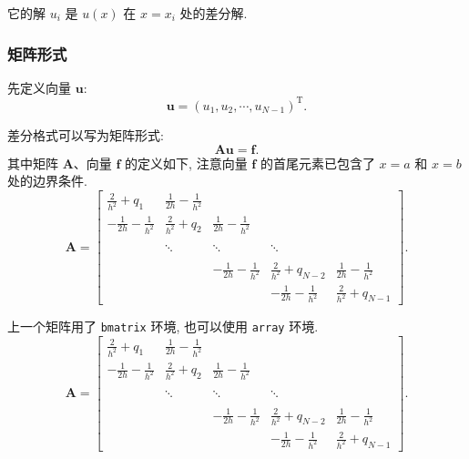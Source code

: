 \documentclass[zihao=-4,twoside,final]{ctexart}
\numberwithin{equation}{section}
\numberwithin{figure}{section}
\numberwithin{table}{section}
\theoremstyle{plain}
\begin{document}
它的解 $u_i$ 是 $u(x)$ 在 $x=x_i$ 处的差分解.


\subsubsection{矩阵形式}

先定义向量 $\boldsymbol{u}$:
\begin{equation*}
  \boldsymbol{u}=(u_{1}, u_{2}, \cdots, u_{N-1})^{\mathrm{T}}.
\end{equation*}

差分格式可以写为矩阵形式:
\begin{equation*}
  \boldsymbol{A}\boldsymbol{u}=\boldsymbol{f}.
\end{equation*}
其中矩阵 $\boldsymbol{A}$、向量 $\boldsymbol{f}$ 的定义如下, 注意向量 $\boldsymbol{f}$ 的首尾元素已包含了 $x=a$ 和 $x=b$ 处的边界条件.
\begin{equation}\label{eq:matrix1}
\boldsymbol{A}=\begin{bmatrix}
\frac{2}{h^{2}}+q_{1} & \frac{1}{2h}-\frac{1}{h^{2}} &   &  &  \\[8pt]
 -\frac{1}{2h}-\frac{1}{h^{2}} & \frac{2}{h^{2}}+q_{2} & \frac{1}{2h}-\frac{1}{h^{2}}  & &  \\[8pt]
  &  &  &  &    \\
  &  \ddots  & \ddots  &  \ddots  &  \\[8pt]
  &  &  &  &    \\
  &   & -\frac{1}{2h}-\frac{1}{h^{2}} & \frac{2}{h^{2}}+q_{N-2}& \frac{1}{2h}-\frac{1}{h^{2}} \\[8pt]
  &  &  & -\frac{1}{2h}-\frac{1}{h^{2}} & \frac{2}{h^{2}}+q_{N-1}
\end{bmatrix}.
\end{equation}

上一个矩阵用了 \verb|bmatrix| 环境, 也可以使用 \verb|array| 环境.
\begin{equation}\label{eq:matrix2}
\boldsymbol{A}=\left[\begin{array}{cccccc}
\frac{2}{h^{2}}+q_{1} & \frac{1}{2h}-\frac{1}{h^{2}} &  &  &  \\[8pt]
 -\frac{1}{2h}-\frac{1}{h^{2}} & \frac{2}{h^{2}}+q_{2} & \frac{1}{2h}-\frac{1}{h^{2}}  & &  \\[8pt]
  &  &  &  &   \\
  &  \ddots  & \ddots & \ddots &  \\[8pt]
  &  &  &  &   \\
  &   & -\frac{1}{2h}-\frac{1}{h^{2}} & \frac{2}{h^{2}}+q_{N-2} & \frac{1}{2h}-\frac{1}{h^{2}} \\[8pt]
  &  &  & -\frac{1}{2h}-\frac{1}{h^{2}} & \frac{2}{h^{2}}+q_{N-1}
\end{array}\right].
\end{equation}
\end{document}
